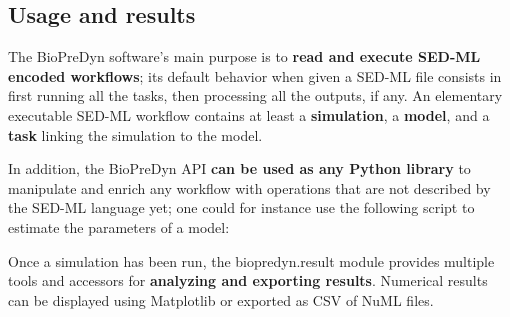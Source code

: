 \documentclass[17pt,portrait,a1,usenames,dvipsnames,plainboxedsections]{sciposter}
\begin{document}
\begin{multicols}{2}
\section{Usage and results}
The BioPreDyn software's main purpose is to {\bf read and execute SED-ML
encoded workflows}; its default behavior when given a SED-ML file consists in
first running all the tasks, then processing all the outputs, if any. An
elementary executable SED-ML workflow contains at least a {\bf simulation}, a
{\bf model}, and a {\bf task} linking the simulation to the model.

In addition, the BioPreDyn API {\bf can be used as any Python library} to
manipulate and enrich any workflow with operations that are not described by
the SED-ML language yet; one could for instance use the following script to
estimate the parameters of a model:

Once a simulation has been run, the biopredyn.result module provides multiple
tools and accessors for {\bf analyzing and exporting results}. Numerical results
can be displayed using Matplotlib\cite{Hunter2007} or exported as CSV of NuML
files.
\begin{figure}
\begin{center}
\begin{minipage}[c]{0.56\textwidth}
\centering

\end{minipage}
\end{center}
\end{figure}
\end{multicols}
\end{document}
